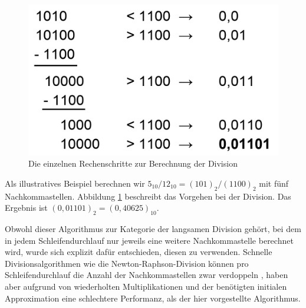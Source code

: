 \documentclass[course=erap]{aspdoc}
\begin{document}
\begin{figure}[h] \centering
  \includegraphics[scale=0.25]{graphiken/division-example.png}
  \caption{Die einzelnen Rechenschritte zur Berechnung der Division} \label{img:beispiel_division}
\end{figure} 

Als illustratives Beispiel berechnen wir $5_{10} / 12_{10} = (101)_2 / (1100)_2$ mit fünf Nachkommastellen.  
Abbildung \ref{img:beispiel_division} beschreibt das Vorgehen bei der Division. Das Ergebnis ist $(0,01101)_2 = (0,40625)_{10}$. \par
Obwohl dieser Algorithmus zur Kategorie der langsamen Division gehört, bei dem in jedem Schleifendurchlauf nur jeweils eine weitere Nachkommastelle berechnet wird, 
wurde sich explizit dafür entschieden, diesen zu verwenden. Schnelle Divisionsalgorithmen wie die Newton-Raphson-Division können pro 
Schleifendurchlauf die Anzahl der Nachkommastellen zwar verdoppeln \cite{newton_raphson_division}, haben aber aufgrund von wiederholten Multiplikationen und der benötigten initialen Approximation eine schlechtere Performanz, als der hier 
vorgestellte Algorithmus.
\end{document}
